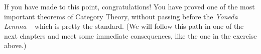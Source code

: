 \begin{remark}
  If you have made to this point, congratulations! You have proved one
  of the most important theorems of {\sc Category Theory}, without
  passing before the {\em Yoneda Lemma} -- which is pretty the
  standard. (We will follow this path in one of the next chapters and
  meet some immediate consequences, like the one in the exercise above.)
\end{remark}



